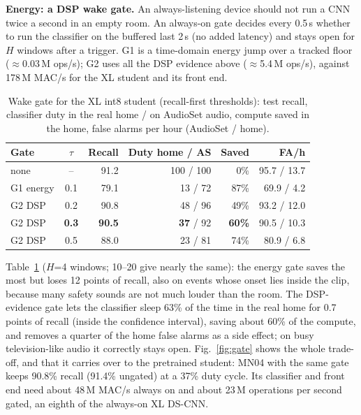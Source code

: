 \documentclass[conference]{IEEEtran}
\begin{document}
\textbf{Energy: a DSP wake gate.} An always-listening device should not run a CNN twice a
second in an empty room. An always-on gate decides every 0.5\,s whether to run the classifier on
the buffered last 2\,s (no added latency) and stays open for $H$ windows after a trigger. G1 is a
time-domain energy jump over a tracked floor ($\approx$0.03\,M ops/s); G2 uses all the DSP
evidence above ($\approx$5.4\,M ops/s), against 178\,M MAC/s for the XL student and its front end.

\begin{table}[t]\centering\caption{Wake gate for the XL int8 student (recall-first thresholds):
test recall, classifier duty in the real home / on AudioSet audio, compute saved in the home,
false alarms per hour (AudioSet / home).}\label{tab:gate}
\setlength{\tabcolsep}{2.5pt}
\begin{tabular}{lcrrrr}\toprule
Gate & $\tau$ & Recall & Duty home / AS & Saved & FA/h \\ \midrule
none & -- & 91.2 & 100 / 100 & 0\% & 95.7 / 13.7 \\
G1 energy & 0.1 & 79.1 & 13 / 72 & 87\% & 69.9 / 4.2 \\
G2 DSP & 0.2 & 90.8 & 48 / 96 & 49\% & 93.2 / 12.0 \\
G2 DSP & \textbf{0.3} & \textbf{90.5} & \textbf{37} / 92 & \textbf{60\%} & 90.5 / 10.3 \\
G2 DSP & 0.5 & 88.0 & 23 / 81 & 74\% & 80.9 / 6.8 \\ \bottomrule
\end{tabular}\end{table}

Table~\ref{tab:gate} ($H$=4 windows; 10--20 give nearly the same): the energy gate saves the
most but loses 12 points of recall, also on events whose onset lies inside the clip, because
many safety sounds are not much louder than the room. The DSP-evidence gate lets the classifier
sleep 63\% of the time in the real home for 0.7 points of recall (inside the confidence interval),
saving about 60\% of the compute, and removes a quarter of the home false alarms as a side effect;
on busy television-like audio it correctly stays open. Fig.~\ref{fig:gate} shows the whole
trade-off, and that it carries over to the pretrained student: MN04 with the same gate keeps
90.8\% recall (91.4\% ungated) at a 37\% duty cycle. Its classifier and front end need about
48\,M MAC/s always on and about 23\,M operations per second gated, an eighth of the always-on XL
DS-CNN.
\end{document}
